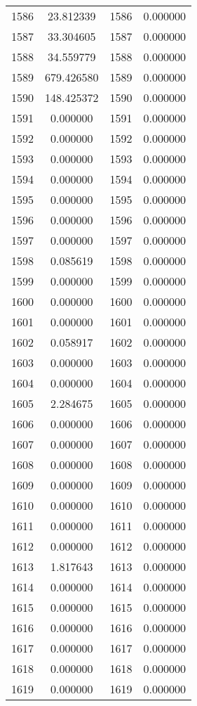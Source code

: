 \documentclass[12pt]{article}
\begin{document}
\begin{longtable}{@{}cccc@{}}
1586 & 23.812339 & 1586 & 0.000000 \\
1587 & 33.304605 & 1587 & 0.000000 \\
1588 & 34.559779 & 1588 & 0.000000 \\
1589 & 679.426580 & 1589 & 0.000000 \\
1590 & 148.425372 & 1590 & 0.000000 \\
1591 & 0.000000 & 1591 & 0.000000 \\
1592 & 0.000000 & 1592 & 0.000000 \\
1593 & 0.000000 & 1593 & 0.000000 \\
1594 & 0.000000 & 1594 & 0.000000 \\
1595 & 0.000000 & 1595 & 0.000000 \\
1596 & 0.000000 & 1596 & 0.000000 \\
1597 & 0.000000 & 1597 & 0.000000 \\
1598 & 0.085619 & 1598 & 0.000000 \\
1599 & 0.000000 & 1599 & 0.000000 \\
1600 & 0.000000 & 1600 & 0.000000 \\
1601 & 0.000000 & 1601 & 0.000000 \\
1602 & 0.058917 & 1602 & 0.000000 \\
1603 & 0.000000 & 1603 & 0.000000 \\
1604 & 0.000000 & 1604 & 0.000000 \\
1605 & 2.284675 & 1605 & 0.000000 \\
1606 & 0.000000 & 1606 & 0.000000 \\
1607 & 0.000000 & 1607 & 0.000000 \\
1608 & 0.000000 & 1608 & 0.000000 \\
1609 & 0.000000 & 1609 & 0.000000 \\
1610 & 0.000000 & 1610 & 0.000000 \\
1611 & 0.000000 & 1611 & 0.000000 \\
1612 & 0.000000 & 1612 & 0.000000 \\
1613 & 1.817643 & 1613 & 0.000000 \\
1614 & 0.000000 & 1614 & 0.000000 \\
1615 & 0.000000 & 1615 & 0.000000 \\
1616 & 0.000000 & 1616 & 0.000000 \\
1617 & 0.000000 & 1617 & 0.000000 \\
1618 & 0.000000 & 1618 & 0.000000 \\
1619 & 0.000000 & 1619 & 0.000000 \\

\end{longtable}
\end{document}

